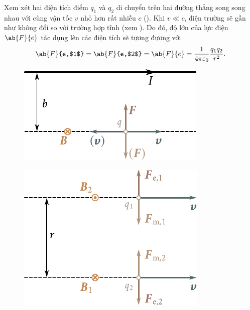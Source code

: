 Xem xét hai điện tích điểm $q_1$ và $q_2$ di chuyển trên hai đường thẳng song song nhau với cùng vận tốc $v$ nhỏ hơn rất nhiều $c$ (). Khi $v\ll c$, điện trường sẽ gần như không đổi so với trường hợp tĩnh (xem ). Do đó, độ lớn của lực điện $\ab{F}{e}$ tác dụng lên các điện tích sẽ tương đương với
\begin{equation}\label{eq:6_37}
    \ab{F}{e,$1$} = \ab{F}{e,$2$} = \ab{F}{e} = \frac{1}{4\pi\varepsilon_0} \frac{q_1 q_2}{r^2}.
\end{equation}

\begin{figure}[t]
	\begin{minipage}[t]{0.48\linewidth}
		\begin{center}
			\includegraphics[scale=1]{figures/ch_06/fig_6_7.pdf}
			\caption[]{}
			\label{fig:6_7}
		\end{center}
	\end{minipage}
	\hfill{ }%
	\begin{minipage}[t]{0.48\linewidth}
		\begin{center}
			\includegraphics[scale=1]{figures/ch_06/fig_6_8.pdf}
			\caption[]{}
			\label{fig:6_8}
		\end{center}
	\end{minipage}
\vspace{-0.4cm}
\end{figure}

